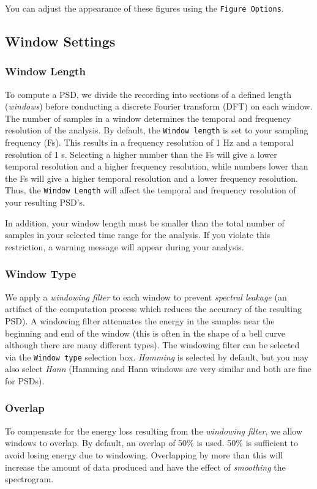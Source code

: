 \documentclass[11pt]{report}
\begin{document}
You can adjust the appearance of these figures using the \texttt{Figure Options}.

\subsection{Window Settings}
\subsubsection{Window Length}
To compute a PSD, we divide the recording into sections of a defined length (\textit{windows}) before conducting a discrete Fourier transform (DFT) on each window. The number of samples in a window determines the temporal and frequency resolution of the analysis. By default, the \texttt{Window length} is set to your sampling frequency (Fs).  This results in a frequency resolution of 1 Hz and a temporal resolution of 1 s. Selecting a higher number than the Fs will give a lower temporal resolution and a higher frequency resolution, while numbers lower than the Fs will give a higher temporal resolution and a lower frequency resolution. Thus, the \texttt{Window Length} will affect the temporal and frequency resolution of your resulting PSD's.

In addition, your window length must be smaller than the total number of samples in your selected time range for the analysis. If you violate this restriction, a warning message will appear during your analysis.

\subsubsection{Window Type}
We apply a \textit{windowing filter} to each window to prevent \textit{spectral leakage} (an artifact of the computation process which reduces the accuracy of the resulting PSD).  A windowing filter attenuates the energy in the samples near the beginning and end of the window (this is often in the shape of a bell curve although there are many different types).   The windowing filter can be selected via the \texttt{Window type} selection box.  \textit{Hamming} is selected by default, but you may also select \textit{Hann} (Hamming and Hann windows are very similar and both are fine for PSDs). 

\subsubsection{Overlap}

To compensate for the energy loss resulting from the \textit{windowing filter}, we allow windows to overlap. 
By default, an overlap of 50\% is used. 50\% is sufficient to avoid losing energy due to windowing.  Overlapping by more than this will increase the amount of data produced and have the effect of \textit{smoothing} the spectrogram.
\end{document}
